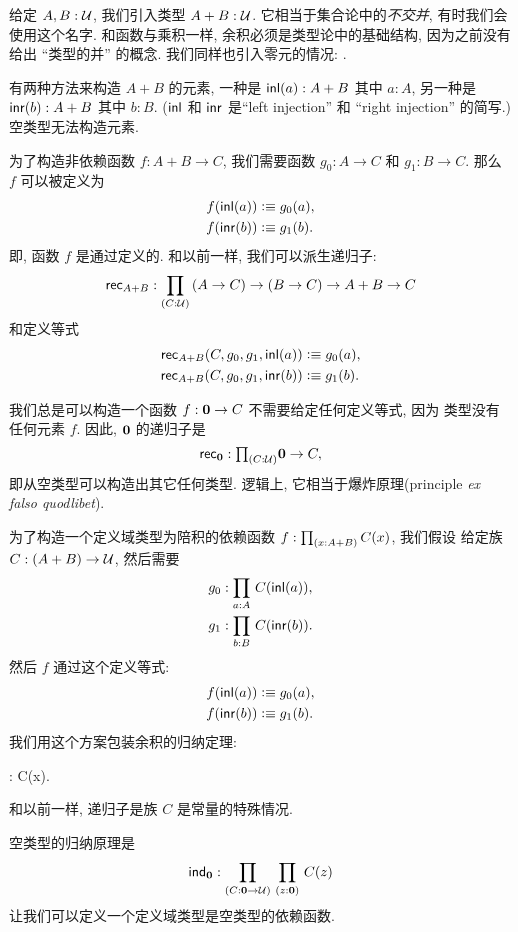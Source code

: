 给定 $A,B:\mathcal{U}$, 我们引入类型 $A+B:\mathcal{U}$. %
%
%
%
%
%
它相当于集合论中的\emph{不交并}, 有时我们会使用这个名字. 和函数与乘积一样, 余积必须是类型论中的基础结构, 因为之前没有给出 ``类型的并'' 的概念. 我们同样也引入零元的情况: . %
%
%

有两种方法来构造 $A+B$ 的元素, 一种是 ${\mathsf{inl}}(a) : A+B$ 其中 $a:A$, 另一种是 ${\mathsf{inr}}(b):A+B$ 其中 $b:B$. (${\mathsf{inl}}$ 和 ${\mathsf{inr}}$ 是``left injection'' 和 ``right injection'' 的简写.) 空类型无法构造元素.  

为了构造非依赖函数 $f : A+B \to C$, 我们需要函数 $g_0 : A \to C$ 和 $g_1 : B \to C$. 那么 $f$ 可以被定义为 \begin{align*}
f({\mathsf{inl}}(a)) &\vcentcolon\equiv g_0(a), \\
f({\mathsf{inr}}(b)) &\vcentcolon\equiv g_1(b).
\end{align*}
即, 函数 $f$ 是通过定义的. %
和以前一样, 我们可以派生递归子: %
\[ \rec{A+B} : \dprd{C:\UU}(A \to C) \to (B\to C) \to A+B \to C\]
和定义等式 \begin{align*}
\mathsf{rec}_{A+B}(C,g_0,g_1,{\mathsf{inl}}(a)) &\vcentcolon\equiv g_0(a), \\
\mathsf{rec}_{A+B}(C,g_0,g_1,{\mathsf{inr}}(b)) &\vcentcolon\equiv g_1(b).
\end{align*}

我们总是可以构造一个函数 $f : \mathbf{0} \to C$ 不需要给定任何定义等式, 因为 \emptyt 类型没有任何元素 $f$. 因此, $\mathbf{0}$ 的递归子是 %
\[\rec{\emptyt} : \tprd{C:\UU} \emptyt \to C,\]
即从空类型可以构造出其它任何类型. 逻辑上, 它相当于爆炸原理(principle \textit{ex falso quodlibet}). 

为了构造一个定义域类型为陪积的依赖函数 $f:\prd{x:A+B}C(x)$, 我们假设 给定族  $C: (A + B) \to \mathcal{U}$, 然后需要  \begin{align*}
g_0 &: \prd{a:A} C(\inl(a)), \\
g_1 &: \prd{b:B} C(\inr(b)).
\end{align*}
然后 $f$ 通过这个定义等式: \begin{align*}
f({\mathsf{inl}}(a)) &\vcentcolon\equiv g_0(a), \\
f({\mathsf{inr}}(b)) &\vcentcolon\equiv g_1(b).
\end{align*}
我们用这个方案包装余积的归纳定理: %
\begin{narrowmultline*}
 :
 \to \narrowbreak
{} \to {}C(x). 
\end{narrowmultline*}
和以前一样, 递归子是族 $C$ 是常量的特殊情况.  

空类型的归纳原理是 %
\[ \ind{\emptyt} : \prd{C:\emptyt \to \UU}{z:\emptyt} C(z) \]
让我们可以定义一个定义域类型是空类型的依赖函数.  %


%
%